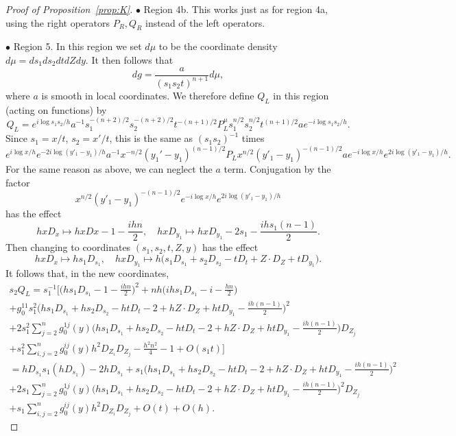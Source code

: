 \documentclass[10pt, a4paper, twoside]{amsart}
\numberwithin{equation}{section}
\theoremstyle{remark}
\begin{document}
\begin{proof}[Proof of Proposition~\ref{prop:K}]
$\bullet$ Region 4b. This works just as for region 4a, using the right operators $P_R, Q_R$ instead of the left operators. 

$\bullet$ Region 5. In this region we set $d\mu$ to be the coordinate density $d\mu = ds_1 ds_2 dt dZ dy$. It then follows that
$$
dg = \frac{a}{(s_1 s_2 t)^{n+1}} d\mu,
$$
where $a$ is smooth in local coordinates. We therefore define $Q_L$ in this region (acting on functions) by 
$$
Q_L = e^{i\log s_1s_2/h} a^{-1} s_1^{-(n+2)/2} s_2^{-(n+2)/2} t^{-(n+1)/2} P_L^\mu s_1^{n/2} s_2^{n/2} t^{(n+1)/2} a e^{-i\log s_1s_2/h}.
$$
Since $s_1 = x/t$, $s_2 = x'/t$, this is the same as $(s_1 s_2)^{-1}$ times 
$$
  e^{i\log x/h} e^{-2i\log(y'_1 - y_1)/h}  a^{-1} x^{-n/2} (y_1' - y_1)^{(n-1)/2} P_L x^{n/2}  (y'_1 - y_1)^{-(n-1)/2} a e^{-i\log x/h} e^{2i\log(y'_1 - y_1)/h}  .
$$
For the same reason as above, we can neglect the $a$ term. Conjugation by the factor 
$$ 
x^{n/2}  (y'_1 - y_1)^{-(n-1)/2}  e^{-i\log x/h} e^{2i\log(y'_1 - y_1)/h}$$ 
has the effect
$$
hxD_x \mapsto hxDx -1 -\frac{ihn}{2}, \quad hx D_{y_1} \mapsto hxD_{y_1} -2s_1 -\frac{ihs_1(n-1)}{2}.
$$
Then changing to coordinates $(s_1, s_2, t, Z, y)$ has the effect
$$
h x D_x \mapsto h s_1 D_{s_1}, \quad h x D_{y_1} \mapsto h \Big( s_1 D_{s_1} +  s_2 D_{s_2} - t D_t  + Z \cdot D_Z + t D_{y_1}\Big).
$$
It follows that, in the new coordinates,
\begin{equation}\begin{gathered}
s_2 Q_L = s_1^{-1} \bigg[  \bigg(hs_1 D_{s_1} -1 -\frac{ihn}{2} \bigg)^2 +  n h \bigg(ihs_1 D_{s_1} -i - \frac{hn}{2} \bigg) \\ + 
g_0^{11} s_1^2 \Big( h s_1 D_{s_1} +  hs_2 D_{s_2} - ht D_t -2 + hZ \cdot D_Z + ht D_{y_1} - \frac{ih(n-1)}{2} \Big)^2 \\
+2 s_1^2 \sum_{j=2}^n g_0^{1j}(y) \Big(h s_1 D_{s_1} +  hs_2 D_{s_2} - ht D_t -2 + hZ \cdot D_Z + ht D_{y_1}  - \frac{ih(n-1)}{2} \Big)D_{Z_j} \\
+ s_1^2 \sum_{i, j = 2}^n g_0^{ij}(y)  h^2D_{Z_i} D_{Z_j} - \frac{h^2 n^2}{4} - 1 +  O(s_1 t)  \Bigg]  \\
= h D_{s_1} s_1 (h D_{s_1}) - 2 h D_{s_1} + s_1 \Big(h s_1 D_{s_1} +  hs_2 D_{s_2} - ht D_t -2 + hZ \cdot D_Z + ht D_{y_1}  - \frac{ih(n-1)}{2} \Big)^2  \\
+ 2 s_1 \sum_{j=2}^n g_0^{1j}(y) \Big( h s_1 D_{s_1} +  hs_2 D_{s_2} - ht D_t -2 + hZ \cdot D_Z + ht D_{y_1}  - \frac{ih(n-1)}{2} \Big)^2  D_{Z_j}  \\
+ s_1 \sum_{i, j = 2}^n g_0^{ij}(y) h^2D_{Z_i} D_{Z_j} 
+ O(t) + O(h). 

\end{gathered}
\end{equation}
\end{proof}
\end{document}
